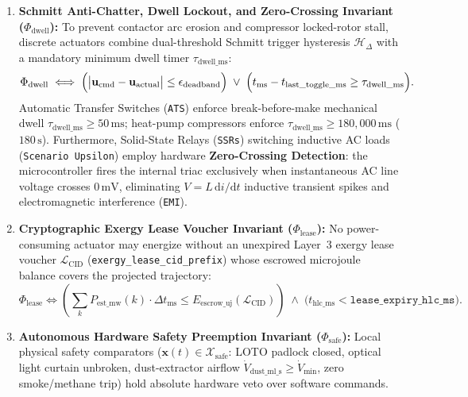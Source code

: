 \begin{enumerate}
    \item \textbf{Schmitt Anti-Chatter, Dwell Lockout, and Zero-Crossing Invariant ($\Phi_{\mathrm{dwell}}$):} To prevent contactor arc erosion and compressor locked-rotor stall, discrete actuators combine dual-threshold Schmitt trigger hysteresis $\mathcal{H}_{\Delta}$ \parencite{astrom2008feedback} with a mandatory minimum dwell timer $\tau_{\mathrm{dwell\_ms}}$:
    \begin{equation}
        \Phi_{\mathrm{dwell}} \iff \Bigl(\bigl|\mathbf{u}_{\mathrm{cmd}} - \mathbf{u}_{\mathrm{actual}}\bigr| \le \epsilon_{\mathrm{deadband}}\Bigr) \;\lor\; \Bigl(t_{\mathrm{ms}} - t_{\mathrm{last\_toggle\_ms}} \ge \tau_{\mathrm{dwell\_ms}}\Bigr).
        \label{eq:l2-phi-dwell}
    \end{equation}
    Automatic Transfer Switches (\texttt{ATS}) enforce break-before-make mechanical dwell $\tau_{\mathrm{dwell\_ms}} \ge 50\,\mathrm{ms}$; heat-pump compressors enforce $\tau_{\mathrm{dwell\_ms}} \ge 180{,}000\,\mathrm{ms}$ ($180\,\mathrm{s}$). Furthermore, Solid-State Relays (\texttt{SSRs}) switching inductive AC loads (\texttt{Scenario Upsilon}) employ hardware \textbf{Zero-Crossing Detection}: the microcontroller fires the internal triac exclusively when instantaneous AC line voltage crosses $0\,\mathrm{mV}$, eliminating $V = L\,\mathrm{d}i/\mathrm{d}t$ inductive transient spikes and electromagnetic interference (\texttt{EMI}).
    \item \textbf{Cryptographic Exergy Lease Voucher Invariant ($\Phi_{\mathrm{lease}}$):} No power-consuming actuator may energize without an unexpired Layer~3 exergy lease voucher $\mathcal{L}_{\mathrm{CID}}$ (\texttt{exergy\_lease\_cid\_prefix}) whose escrowed microjoule balance covers the projected trajectory:
    \begin{equation}
        \Phi_{\mathrm{lease}} \iff \left(\sum_{k} P_{\mathrm{est\_mw}}(k)\cdot\Delta t_{\mathrm{ms}} \le E_{\mathrm{escrow\_uj}}(\mathcal{L}_{\mathrm{CID}})\right) \;\land\; \bigl(t_{\mathrm{hlc\_ms}} < \mathtt{lease\_expiry\_hlc\_ms}\bigr).
        \label{eq:l2-phi-lease}
    \end{equation}
    \item \textbf{Autonomous Hardware Safety Preemption Invariant ($\Phi_{\mathrm{safe}}$):} Local physical safety comparators ($\mathbf{x}(t) \in \mathcal{X}_{\mathrm{safe}}$: LOTO padlock closed, optical light curtain unbroken, dust-extractor airflow $\dot{V}_{\mathrm{dust\_ml\_s}} \ge \dot{V}_{\min}$, zero smoke/methane trip) hold absolute hardware veto over software commands.
\end{enumerate}

